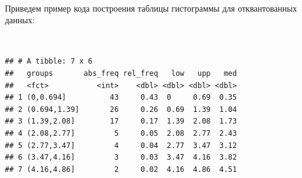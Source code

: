 \documentclass[
  14,
]{article}
\newenvironment{Shaded}{\begin{snugshade}}{\end{snugshade}}
\newcommand{\AttributeTok}[1]{\textcolor[rgb]{0.77,0.63,0.00}{#1}}
\newcommand{\CommentTok}[1]{\textcolor[rgb]{0.56,0.35,0.01}{\textit{#1}}}
\newcommand{\DecValTok}[1]{\textcolor[rgb]{0.00,0.00,0.81}{#1}}
\newcommand{\FunctionTok}[1]{\textcolor[rgb]{0.00,0.00,0.00}{#1}}
\newcommand{\NormalTok}[1]{#1}
\newcommand{\OtherTok}[1]{\textcolor[rgb]{0.56,0.35,0.01}{#1}}
\newcommand{\SpecialCharTok}[1]{\textcolor[rgb]{0.00,0.00,0.00}{#1}}
\begin{document}
\(\ \)

Приведем пример кода построения таблицы гистограммы для отквантованных
данных:

\(\ \)

\begin{Shaded}
\end{Shaded}

\begin{verbatim}
## # A tibble: 7 x 6
##   groups       abs_freq rel_freq   low   upp   med
##   <fct>           <int>    <dbl> <dbl> <dbl> <dbl>
## 1 (0,0.694]          43     0.43  0     0.69  0.35
## 2 (0.694,1.39]       26     0.26  0.69  1.39  1.04
## 3 (1.39,2.08]        17     0.17  1.39  2.08  1.73
## 4 (2.08,2.77]         5     0.05  2.08  2.77  2.43
## 5 (2.77,3.47]         4     0.04  2.77  3.47  3.12
## 6 (3.47,4.16]         3     0.03  3.47  4.16  3.82
## 7 (4.16,4.86]         2     0.02  4.16  4.86  4.51
\end{verbatim}

\(\ \)
\end{document}
